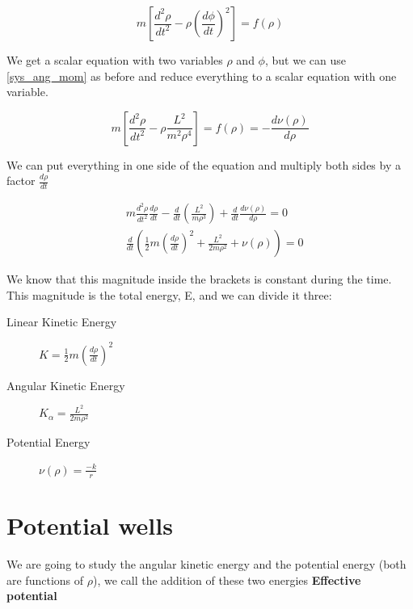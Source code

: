 \begin{equation}
    \label{scalar_eq}
    m\left[ \frac{d^2\rho}{dt^2}-\rho\left(\frac{d\phi}{dt}\right)^2 \right] = f(\rho)
\end{equation}

We get a scalar equation with two variables $\rho$ and $\phi$, but we can use \ref{sys_ang_mom} as before and reduce everything to a scalar equation with one variable.

\begin{equation}
    \label{solution_1}
    m\left[ \frac{d^2\rho}{dt^2}-\rho\frac{L^2}{m^2\rho^4}\right] = f(\rho) = -\frac{d\nu(\rho)}{d\rho}
\end{equation}

We can put everything in one side of the equation and multiply both sides by a factor $\frac{d\rho}{dt}$

\begin{equation} \label{solution_2}
    \begin{split}
    & m \frac{d^2\rho}{dt^2} \frac{d\rho}{dt} - \frac{d}{dt} \left( \frac{L^2}{m\rho^3} \right) + \frac{d}{dt} \frac{d\nu(\rho)}{d\rho} = 0 \\
    & \frac{d}{dt} \left(\frac{1}{2}m\left(\frac{d\rho}{dt}\right)^2+\frac{L^2}{2m\rho^2}+ \nu(\rho) \right) = 0
    \end{split}
\end{equation}

We know that this magnitude inside the brackets is constant during the time. This magnitude is the total energy, E, and we can divide it three:

\begin{description}
    \item [Linear Kinetic Energy] $K = \frac{1}{2}m(\frac{d\rho}{dt})^2$
    \item [Angular Kinetic Energy] $K_{\alpha} = \frac{L^2}{2m\rho^2}$
    \item [Potential Energy] $\nu(\rho) = \frac{-k}{r}$   
\end{description}

\section{Potential wells}

We are going to study the angular kinetic energy and the potential energy (both are functions of $\rho$), we call the addition of these two energies \textbf{Effective potential}

